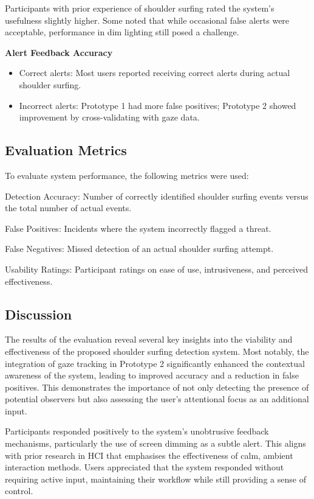\documentclass[12pt]{article}
\theoremstyle{plain}
\theoremstyle{definition}
\begin{document}
Participants with prior experience of shoulder surfing rated the system’s usefulness slightly higher. Some noted that while occasional false alerts were acceptable, performance in dim lighting still posed a challenge.

\textbf{Alert Feedback Accuracy}

\begin{itemize}
    \item Correct alerts: Most users reported receiving correct alerts during actual shoulder surfing.
    \item Incorrect alerts: Prototype 1 had more false positives;
    Prototype 2 showed improvement by cross-validating with gaze data.
\end{itemize}

\subsection{Evaluation Metrics}
To evaluate system performance, the following metrics were used:

Detection Accuracy: Number of correctly identified shoulder surfing events versus the total number of actual events.

False Positives: Incidents where the system incorrectly flagged a threat.

False Negatives: Missed detection of an actual shoulder surfing attempt.

Usability Ratings: Participant ratings on ease of use, intrusiveness, and perceived effectiveness.

\subsection{Discussion}

The results of the evaluation reveal several key insights into the viability and effectiveness of the proposed shoulder surfing detection system. Most notably, the integration of gaze tracking in Prototype 2 significantly enhanced the contextual awareness of the system, leading to improved accuracy and a reduction in false positives. This demonstrates the importance of not only detecting the presence of potential observers but also assessing the user’s attentional focus as an additional input.

Participants responded positively to the system’s unobtrusive feedback mechanisms, particularly the use of screen dimming as a subtle alert. This aligns with prior research in HCI that emphasises the effectiveness of calm, ambient interaction methods. Users appreciated that the system responded without requiring active input, maintaining their workflow while still providing a sense of control.
\end{document}
